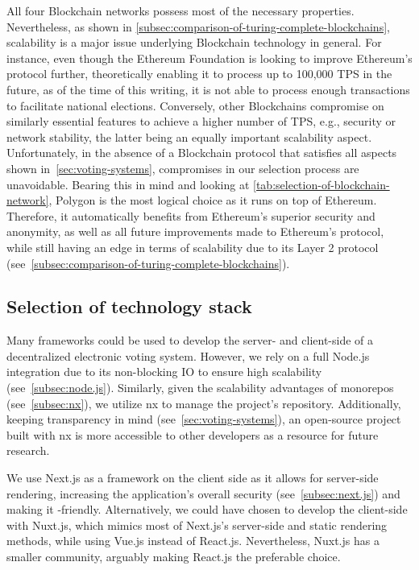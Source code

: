 All four \gls{Blockchain} networks possess most of the necessary properties.
Nevertheless, as shown in \cref{subsec:comparison-of-turing-complete-blockchains}, scalability is a major issue underlying \gls{Blockchain} technology in general.
For instance, even though the Ethereum Foundation is looking to improve Ethereum's protocol further, theoretically enabling it to process up to 100,000 \gls{TPS} in the future, as of the time of this writing, it is not able to process enough transactions to facilitate national elections.
Conversely, other \glspl{Blockchain} compromise on similarly essential features to achieve a higher number of \gls{TPS}, e.g., security or network stability, the latter being an equally important scalability aspect.
Unfortunately, in the absence of a \gls{Blockchain} protocol that satisfies all aspects shown in~\cref{sec:voting-systems}, compromises in our selection process are unavoidable.
Bearing this in mind and looking at \cref{tab:selection-of-blockchain-network}, Polygon is the most logical choice as it runs on top of Ethereum.
Therefore, it automatically benefits from Ethereum's superior security and anonymity, as well as all future improvements made to Ethereum's protocol, while still having an edge in terms of scalability due to its Layer 2 protocol (see~\cref{subsec:comparison-of-turing-complete-blockchains}).

\subsection{Selection of technology stack}\label{subsec:selection-of-tech-stack}

Many frameworks could be used to develop the server- and client-side of a decentralized electronic voting system.
However, we rely on a full Node.js integration due to its non-blocking \gls{IO} to ensure high scalability (see~\cref{subsec:node.js}).
Similarly, given the scalability advantages of monorepos (see~\cref{subsec:nx}), we utilize nx to manage the project's repository.
Additionally, keeping transparency in mind (see~\cref{sec:voting-systems}), an open-source project built with nx is more accessible to other developers as a resource for future research.

We use Next.js as a framework on the client side as it allows for server-side rendering, increasing the application's overall security (see~\cref{subsec:next.js}) and making it -friendly.
Alternatively, we could have chosen to develop the client-side with Nuxt.js, which mimics most of Next.js's server-side and static rendering methods, while using Vue.js instead of React.js.
Nevertheless, Nuxt.js has a smaller community, arguably making React.js the preferable choice.


